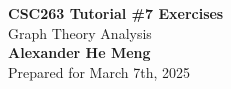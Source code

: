 \begin{titlepage}
    \null %
    \vfill
    \begin{center}
        {\fontsize{35}{48}\selectfont \bfseries CSC263 Tutorial \#7 Exercises}
        \vspace{20pt} \\
        {\LARGE Graph Theory Analysis} \\
        \vspace{20pt}
        \textbf{Alexander He Meng}
        \vspace{8pt}
        \\ Prepared for March 7th, 2025
    \end{center}
    \vfill
\end{titlepage}
